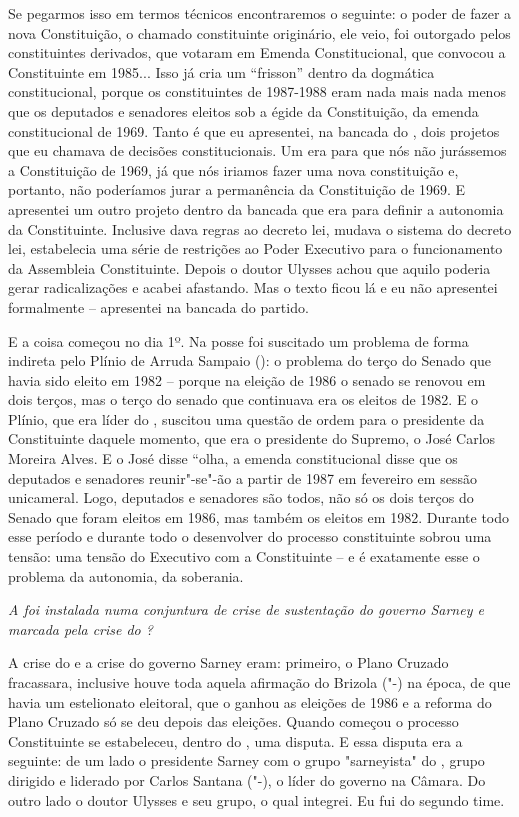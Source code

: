 Se pegarmos isso em termos técnicos encontraremos o seguinte: o poder de
fazer a nova Constituição, o chamado constituinte originário, ele veio,
foi outorgado pelos constituintes derivados, que votaram em Emenda
Constitucional, que convocou a Constituinte em 1985... Isso já cria um
``frisson'' dentro da dogmática constitucional, porque os constituintes
de 1987-1988 eram nada mais nada menos que os deputados e senadores
eleitos sob a égide da Constituição, da emenda constitucional de 1969.
Tanto é que eu apresentei, na bancada do , dois projetos que eu
chamava de decisões constitucionais. Um era para que nós não jurássemos
a Constituição de 1969, já que nós iriamos fazer uma nova constituição
e, portanto, não poderíamos jurar a permanência da Constituição de 1969.
E apresentei um outro projeto dentro da bancada que era para definir a
autonomia da Constituinte. Inclusive dava regras ao decreto lei, mudava
o sistema do decreto lei, estabelecia uma série de restrições ao Poder
Executivo para o funcionamento da Assembleia Constituinte. Depois o
doutor Ulysses achou que aquilo poderia gerar radicalizações e acabei
afastando. Mas o texto ficou lá e eu não apresentei formalmente --
apresentei na bancada do partido.

E a coisa começou no dia 1º. Na posse foi suscitado um problema de forma
indireta pelo Plínio de Arruda Sampaio (): o problema do terço do
Senado que havia sido eleito em 1982 -- porque na eleição de 1986 o
senado se renovou em dois terços, mas o terço do senado que continuava
era os eleitos de 1982. E o Plínio, que era líder do , suscitou uma
questão de ordem para o presidente da Constituinte daquele momento, que
era o presidente do Supremo, o José Carlos Moreira Alves. E o José disse
``olha, a emenda constitucional disse que os deputados e senadores
reunir"-se"-ão a partir de 1987 em fevereiro em sessão unicameral. Logo,
deputados e senadores são todos, não só os dois terços do Senado que
foram eleitos em 1986, mas também os eleitos em 1982. Durante todo esse
período e durante todo o desenvolver do processo constituinte sobrou uma
tensão: uma tensão do Executivo com a Constituinte -- e é exatamente
esse o problema da autonomia, da soberania.

\medskip

\noindent\emph{A  foi instalada numa conjuntura de crise de sustentação do
governo Sarney e marcada pela crise do ?}

A crise do  e a crise do governo Sarney eram:
primeiro, o Plano Cruzado fracassara, inclusive houve toda aquela
afirmação do Brizola ("-) na época, de que havia um estelionato
eleitoral, que o  ganhou as eleições de 1986 e a reforma do Plano
Cruzado só se deu depois das eleições. Quando começou o processo
Constituinte se estabeleceu, dentro do , uma disputa. E essa disputa
era a seguinte: de um lado o presidente Sarney com o grupo "sarneyista"
do , grupo dirigido e liderado por Carlos Santana ("-), o líder
do governo na Câmara. Do outro lado o doutor Ulysses e seu grupo, o qual
integrei. Eu fui do segundo time.

